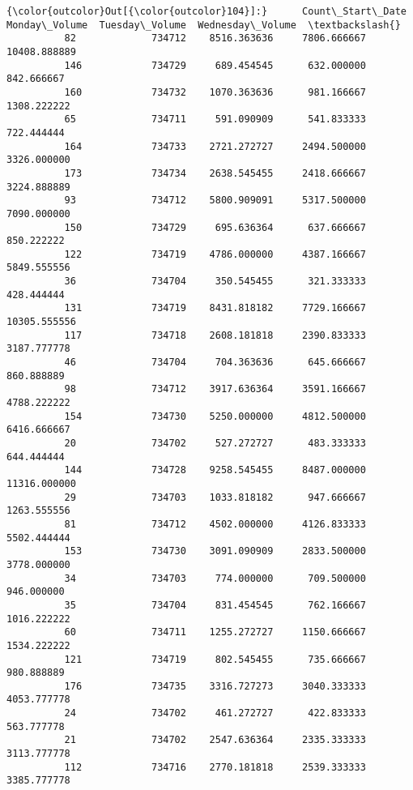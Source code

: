 \documentclass[11pt]{article}
\begin{document}
\begin{Verbatim}[commandchars=\\\{\}]
{\color{outcolor}Out[{\color{outcolor}104}]:}      Count\_Start\_Date  Monday\_Volume  Tuesday\_Volume  Wednesday\_Volume  \textbackslash{}
          82             734712    8516.363636     7806.666667      10408.888889   
          146            734729     689.454545      632.000000        842.666667   
          160            734732    1070.363636      981.166667       1308.222222   
          65             734711     591.090909      541.833333        722.444444   
          164            734733    2721.272727     2494.500000       3326.000000   
          173            734734    2638.545455     2418.666667       3224.888889   
          93             734712    5800.909091     5317.500000       7090.000000   
          150            734729     695.636364      637.666667        850.222222   
          122            734719    4786.000000     4387.166667       5849.555556   
          36             734704     350.545455      321.333333        428.444444   
          131            734719    8431.818182     7729.166667      10305.555556   
          117            734718    2608.181818     2390.833333       3187.777778   
          46             734704     704.363636      645.666667        860.888889   
          98             734712    3917.636364     3591.166667       4788.222222   
          154            734730    5250.000000     4812.500000       6416.666667   
          20             734702     527.272727      483.333333        644.444444   
          144            734728    9258.545455     8487.000000      11316.000000   
          29             734703    1033.818182      947.666667       1263.555556   
          81             734712    4502.000000     4126.833333       5502.444444   
          153            734730    3091.090909     2833.500000       3778.000000   
          34             734703     774.000000      709.500000        946.000000   
          35             734704     831.454545      762.166667       1016.222222   
          60             734711    1255.272727     1150.666667       1534.222222   
          121            734719     802.545455      735.666667        980.888889   
          176            734735    3316.727273     3040.333333       4053.777778   
          24             734702     461.272727      422.833333        563.777778   
          21             734702    2547.636364     2335.333333       3113.777778   
          112            734716    2770.181818     2539.333333       3385.777778   

\end{Verbatim}
\end{document}
